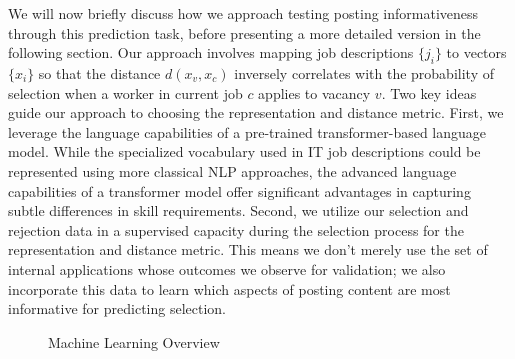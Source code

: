 \documentclass[12pt]{article}
\begin{document}
We will now briefly discuss how we approach testing posting informativeness through this prediction task, before presenting a more detailed version in the following section. Our approach involves mapping job descriptions \(\{j_i\}\) to vectors \(\{x_i\}\) so that the distance \(d(x_v, x_c)\) inversely correlates with the probability of selection when a worker in current job \(c\) applies to vacancy \(v\). Two key ideas guide our approach to choosing the representation and distance metric. First, we leverage the language capabilities of a pre-trained transformer-based language model. While the specialized vocabulary used in IT job descriptions could be represented using more classical NLP approaches, the advanced language capabilities of a transformer model offer significant advantages in capturing subtle differences in skill requirements. Second, we utilize our selection and rejection data in a supervised capacity during the selection process for the representation and distance metric. This means we don't merely use the set of internal applications whose outcomes we observe for validation; we also incorporate this data to learn which aspects of posting content are most informative for predicting selection.


\begin{figure} %
    \centering %
    \caption{Machine Learning Overview} %
    \label{fig:ml_pipeline} %
\end{figure}
\end{document}

